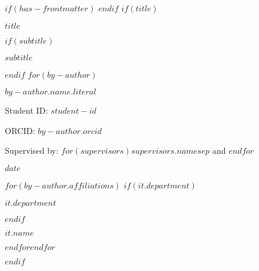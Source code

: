$if(has-frontmatter)$
\frontmatter
$endif$
$if(title)$
\cleardoublepage
\thispagestyle{empty}
{\centering
{\Huge\bfseries $title$ \par}
$if(subtitle)$
\vspace{3ex}
{\Large\bfseries $subtitle$ \par}
$endif$
\vspace{12ex}
$for(by-author)$
{\Large\bfseries $by-author.name.literal$ \par}
{\Large Student ID: $student-id$ \par}
{\Large ORCID: $by-author.orcid$ \par}
{\Large Supervised by: $for(supervisors)$$supervisors.name$$sep$ and $endfor$\par}
{\bfseries\large $date$ \par}
\vspace{12ex}
$for(by-author.affiliations)$%
$if(it.department)$%
{\bfseries\large $it.department$ \par}
\vspace{3ex}
$endif$%
{\bfseries\large $it.name$ \par}
$endfor$$endfor$%
}
$endif$